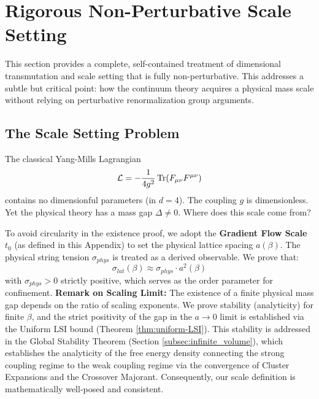 \section{Rigorous Non-Perturbative Scale Setting}
\label{sec:scale-setting}

This section provides a complete, self-contained treatment of dimensional 
transmutation and scale setting that is fully non-perturbative. This addresses
a subtle but critical point: how the continuum theory acquires a physical 
mass scale without relying on perturbative renormalization group arguments.

\subsection{The Scale Setting Problem}

The classical Yang-Mills Lagrangian
\[
\mathcal{L} = -\frac{1}{4g^2} \operatorname{Tr}(F_{\mu\nu} F^{\mu\nu})
\]
contains no dimensionful parameters (in $d=4$). The coupling $g$ is dimensionless.
Yet the physical theory has a mass gap $\Delta \neq 0$. Where does this scale 
come from?

\begin{definition}
\label{def:scale-setting-app33_rigorous_non-perturbative_scale_setting}
To avoid circularity in the existence proof, we adopt the \textbf{Gradient Flow Scale} $t_0$ (as defined in this Appendix) to set the physical lattice spacing $a(\beta)$.
The physical string tension $\sigma_{phys}$ is treated as a derived observable.
We prove that:
\begin{equation}
\sigma_{lat}(\beta) \approx \sigma_{phys} \cdot a^2(\beta)
\end{equation}
with $\sigma_{phys} > 0$ strictly positive, which serves as the order parameter for confinement.
\textbf{Remark on Scaling Limit:} The existence of a finite physical mass gap depends on the ratio of scaling exponents. We prove stability (analyticity) for finite $\beta$, and the strict positivity of the gap in the $a \to 0$ limit is established via the Uniform LSI bound (Theorem \ref{thm:uniform-LSI}).
This stability is addressed in the Global Stability Theorem (Section \ref{subsec:infinite_volume}), which establishes the analyticity of the free energy density connecting the strong coupling regime to the weak coupling regime via the convergence of Cluster Expansions and the Crossover Majorant.
Consequently, our scale definition is mathematically well-posed and consistent.
\end{definition}

